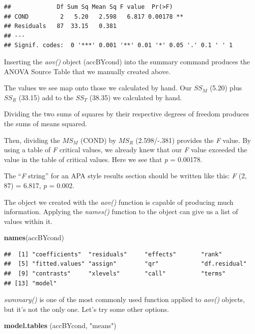 \documentclass[
  english,
]{book}
\newenvironment{Shaded}{\begin{snugshade}}{\end{snugshade}}
\newcommand{\KeywordTok}[1]{\textcolor[rgb]{0.13,0.29,0.53}{\textbf{#1}}}
\newcommand{\NormalTok}[1]{#1}
\newcommand{\StringTok}[1]{\textcolor[rgb]{0.31,0.60,0.02}{#1}}
\begin{document}
\begin{verbatim}
##             Df Sum Sq Mean Sq F value  Pr(>F)   
## COND         2   5.20   2.598   6.817 0.00178 **
## Residuals   87  33.15   0.381                   
## ---
## Signif. codes:  0 '***' 0.001 '**' 0.01 '*' 0.05 '.' 0.1 ' ' 1
\end{verbatim}

Inserting the \emph{aov()} object (accBYcond) into the summary command produces the ANOVA Source Table that we manually created above.

The values we see map onto those we calculated by hand. Our \(SS_M\) (5.20) plus \(SS_R\) (33.15) add to the \(SS_T\) (38.35) we calculated by hand.

Dividing the two sums of squares by their respective degrees of freedom produces the sums of means squared.

Then, dividing the \(MS_M\) (COND) by \(MS_R\) (2.598/-.381) provides the \emph{F} value. By using a table of \emph{F} critical values, we already knew that our \emph{F} value exceeded the value in the table of critical values. Here we see that \emph{p} = 0.00178.

The ``\emph{F} string'' for an APA style results section should be written like this: \emph{F} (2, 87) = 6.817, \emph{p} = 0.002.

The object we created with the \emph{aov()} function is capable of producing much information. Applying the \emph{names()} function to the object can give us a list of values within it.

\begin{Shaded}
\begin{Highlighting}[]
\KeywordTok{names}\NormalTok{(accBYcond)}
\end{Highlighting}
\end{Shaded}

\begin{verbatim}
##  [1] "coefficients"  "residuals"     "effects"       "rank"         
##  [5] "fitted.values" "assign"        "qr"            "df.residual"  
##  [9] "contrasts"     "xlevels"       "call"          "terms"        
## [13] "model"
\end{verbatim}

\emph{summary()} is one of the most commonly used function applied to \emph{aov()} objects, but it's not the only one.
Let's try some other options.

\begin{Shaded}
\begin{Highlighting}[]
\KeywordTok{model.tables}\NormalTok{ (accBYcond, }\StringTok{"means"}\NormalTok{)}
\end{Highlighting}
\end{Shaded}
\end{document}
